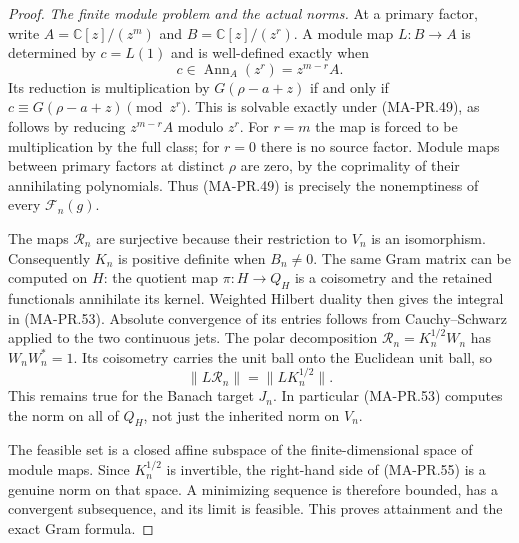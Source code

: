 \begin{proof}
\emph{The finite module problem and the actual norms.}
At a primary factor, write
\(A=\mathbb C[z]/(z^m)\) and \(B=\mathbb C[z]/(z^r)\).
A module map \(L:B\to A\) is determined by \(c=L(1)\)
and is well-defined exactly when
\[
        c\in\operatorname{Ann}_A(z^r)=z^{m-r}A .
 \tag{MA-PR.54}
\]
Its reduction is multiplication by \(G(\rho-a+z)\)
if and only if \(c\equiv G(\rho-a+z)\pmod {z^r}\).
This is solvable exactly under (MA-PR.49), as follows
by reducing \(z^{m-r}A\) modulo \(z^r\).
For \(r=m\) the map is forced to be multiplication by
the full class; for \(r=0\) there is no source factor.
Module maps between primary factors at distinct \(\rho\)
are zero, by the coprimality of their annihilating
polynomials.  Thus (MA-PR.49) is precisely the
nonemptiness of every \(\mathcal F_n(g)\).

The maps \(\mathscr R_n\) are surjective because their
restriction to \(V_n\) is an isomorphism.  Consequently
\(K_n\) is positive definite when \(B_n\ne0\).
The same Gram matrix can be computed on \(H\):
the quotient map \(\pi:H\to Q_H\) is a coisometry and
the retained functionals annihilate its kernel.
Weighted Hilbert duality then gives the integral in
(MA-PR.53).  Absolute convergence of its entries follows
from Cauchy--Schwarz applied to the two continuous jets.
The polar decomposition
\(\mathscr R_n=K_n^{1/2}W_n\) has \(W_nW_n^*=1\).
Its coisometry carries the unit ball onto the Euclidean
unit ball, so
\[
                  \|L\mathscr R_n\|=\|LK_n^{1/2}\|.
 \tag{MA-PR.55}
\]
This remains true for the Banach target \(J_n\).
In particular (MA-PR.53) computes the norm on all of
\(Q_H\), not just the inherited norm on \(V_n\).

The feasible set is a closed affine subspace of the
finite-dimensional space of module maps.
Since \(K_n^{1/2}\) is invertible, the right-hand side
of (MA-PR.55) is a genuine norm on that space.
A minimizing sequence is therefore bounded, has a
convergent subsequence, and its limit is feasible.
This proves attainment and the exact Gram formula.


\end{proof}
